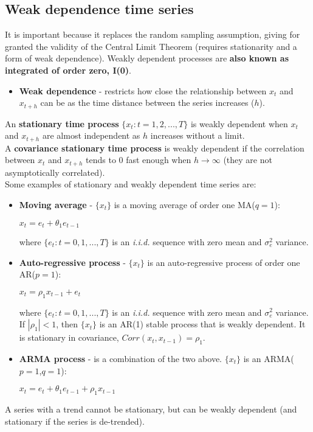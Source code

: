\documentclass[10pt, a4paper, landscape]{extarticle}
\begin{document}
\begin{multicols}{3}
	\subsection*{Weak dependence time series}
		It is important because it replaces the random sampling assumption, giving for granted the validity of the Central Limit Theorem (requires stationarity and a form of weak dependence). Weakly dependent processes are \textbf{also known as integrated of order zero, I(0)}.
		\begin{itemize}[leftmargin=*]
			\item \textbf{Weak dependence} - restricts how close the relationship between $x_t$ and $x_{t+h}$ can be as the time distance between the series increases ($h$).
		\end{itemize}
		An \textbf{stationary time process} $\lbrace x_t: t = 1, 2, ..., T \rbrace$ is weakly dependent when $x_t$ and $x_{t+h}$ are almost independent as $h$ increases without a limit.
		\\ A \textbf{covariance stationary time process} is weakly dependent if the correlation between $x_t$ and $x_{t+h}$ tends to $0$ fast enough when $h \rightarrow \infty$ (they are not asymptotically correlated).
		\\ Some examples of stationary and weakly dependent time series are:
		\begin{itemize}[leftmargin=*]
			\item \textbf{Moving average} - $\lbrace x_t \rbrace$ is a moving average of order one MA($q=1$):
			\begin{center}
				$x_t = e_t + \theta_1 e_{t-1}$
			\end{center}
			where $\lbrace e_t: t = 0, 1, ..., T \rbrace$ is an \textsl{i.i.d.} sequence with zero mean and $\sigma^2_e$ variance.
			\item \textbf{Auto-regressive process} - $\lbrace x_t \rbrace$ is an auto-regressive process of order one AR($p=1$):
			\begin{center}
				$x_t = \rho_1 x_{t-1} + e_t$
			\end{center}
			where $\lbrace e_t: t = 0, 1, ..., T \rbrace$ is an \textsl{i.i.d.} sequence with zero mean and $\sigma^2_e$ variance.
			\\ If $|\rho_1|<1$, then $\lbrace x_t \rbrace$ is an AR(1) stable process that is weakly dependent. It is stationary in covariance, $Corr(x_t, x_{t-1}) = \rho_1$.
			\item \textbf{ARMA process} - is a combination of the two above. $\lbrace x_t \rbrace$ is an ARMA($p=1$,$q=1$):
			\begin{center}
				$x_t = e_t + \theta_1 e_{t-1} + \rho_1 x_{t-1}$
			\end{center}
		\end{itemize}
		A series with a trend cannot be stationary, but can be weakly dependent (and stationary if the series is de-trended).
\columnbreak

\end{multicols}
\end{document}
